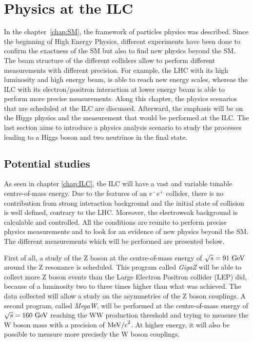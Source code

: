 \chapter{Physics at the ILC}
\label{chap:phyiscs}

  In the chapter~\ref{chap:SM}, the framework of particles physics was described. 
  Since the beginning of High Energy Physics, different experiments have been done to confirm the exactness of the SM but also to find new physics beyond the SM. 
  The beam structure of the different colliders allow to perform different measurements with different precision. 
  For example, the \gls{LHC} with its high luminosity and high energy beam, is able to reach new energy scales, whereas the \gls{ILC} with its electron/positron interaction at lower energy beam is able to perform more precise measurements. 
  Along this chapter, the physics scenarios that are scheduled at the \gls{ILC} are discussed. 
  Afterward, the emphasis will be on the Higgs physics and the measurement that would be performed at the \gls{ILC}. 
  The last section aims to introduce a physics analysis scenario to study the processes leading to a Higgs boson and two neutrinos in the final state.
 
 \minitoc

  \section{Potential studies}

  As seen in chapter \ref{chap:ILC}, the \gls{ILC} will have a vast and variable tunable centre-of-mass energy.
  Due to the features of an $e^-e^+$ collider, there is no contribution from strong interaction background and the initial state of collision is well defined, contrary to the \gls{LHC}.
  Moreover, the electroweak background is calculable and controlled.
  All the conditions are reunite to perform precise physics measurements and to look for an evidence of new physics beyond the \gls{SM}.
  The different measurements which will be performed are presented below.

   First of all, a study of the Z boson at the centre-of-mass energy of $\sqrt{s} = 91~\rm{GeV}$ around the Z resonance is scheduled. 
   This program called \textit{GigaZ} will be able to collect more Z boson events than the Large Electron Positron collider (LEP) did, because of a luminosity two to three times higher than what was achieved. 
   The data collected will allow a study on the asymmetries of the Z boson couplings. 
   A second program, called \textit{MegaW}, will be performed at the centre-of-mass energy of $\sqrt{s} = 160~\rm{GeV}$ reaching the WW production threshold and trying to measure the W boson mass with a precision of $\rm{MeV/c}^2$.
   At higher energy, it will also be possible to measure more precisely the W boson couplings.


